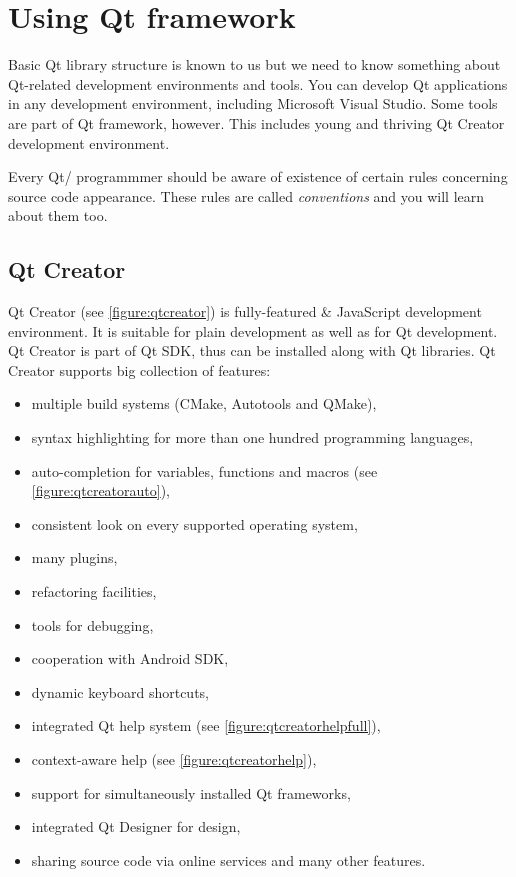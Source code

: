 \chapter{Using Qt framework}
Basic Qt library structure is known to us but we need to know something about Qt-related development environments and tools. You can develop Qt applications in any development environment, including Microsoft Visual Studio. Some tools are part of Qt framework, however. This includes young and thriving Qt Creator development environment.

Every Qt/\cpp{} programmmer should be aware of existence of certain rules concerning source code appearance. These rules are called \textit{conventions} and you will learn about them too.

\section{Qt Creator}
Qt Creator (see \autoref{figure:qtcreator}) is fully-featured \cpp{} \& JavaScript development environment. It is suitable for plain \cpp{}  development as well as for Qt development. Qt Creator is part of Qt SDK, thus can be installed along with Qt libraries. Qt Creator supports big collection of features:
\begin{itemize}
\item multiple build systems (CMake, Autotools and QMake),
\item syntax highlighting for more than one hundred programming languages,
\item auto-completion for variables, functions and macros (see \autoref{figure:qtcreatorauto}),
\item consistent look on every supported operating system,
\item many plugins,
\item refactoring facilities,
\item tools for debugging,
\item cooperation with Android SDK,
\item dynamic keyboard shortcuts,
\item integrated Qt help system (see \autoref{figure:qtcreatorhelpfull}),
\item context-aware help (see \autoref{figure:qtcreatorhelp}),
\item support for simultaneously installed Qt frameworks,
\item integrated Qt Designer for  design,
\item sharing source code via online services and many other features.
\end{itemize}

